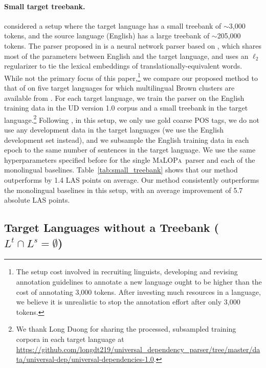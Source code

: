 \documentclass[11pt]{article}
\newcommand{\malopa}{\textsc{MaLOPa}}
\begin{document}
\paragraph{Small target treebank.}
 considered a setup where the target language has a small treebank of $\sim$3,000 tokens, and the source language (English) has a large treebank of $\sim$205,000 tokens.
The parser proposed in  is a neural network parser based on , which shares most of the parameters between English and the target language, and uses an $\ell_2$ regularizer to tie the lexical embeddings of translationally-equivalent words.
While not the primary focus of this paper,\footnote{The setup cost involved in recruiting linguists, developing and revising annotation guidelines to annotate a new language ought to be higher than the cost of annotating 3,000 tokens. After investing much resources in a language, we believe it is unrealistic to stop the annotation effort after only 3,000 tokens.}
we compare our proposed method to that of  on five target languages for which multilingual Brown clusters are available from .
For each target language, we train the parser on the English training data in the UD version 1.0 corpus \cite{universal:v1_0} and a small treebank in the target language.\footnote{We thank Long Duong for sharing the processed, subsampled training corpora in each target language at \url{https://github.com/longdt219/universal_dependency_parser/tree/master/data/universal-dep/universal-dependencies-1.0}.}
Following , in this setup, we only use gold coarse POS tags, we do not use any development data in the target languages (we use the English development set instead), and we subsample the English training data in each epoch to the same number of sentences in the target language.
We use the same hyperparameters specified before for the single \malopa~parser and each of the monolingual baselines.
Table~\ref{tab:small_treebank} shows that our method outperforms  by 1.4 LAS points on average.
Our method consistently outperforms the monolingual baselines in this setup, with an average improvement of 5.7 absolute LAS points.

\subsection{Target Languages without a Treebank ($L^t \cap L^s = \emptyset$)}
\end{document}
